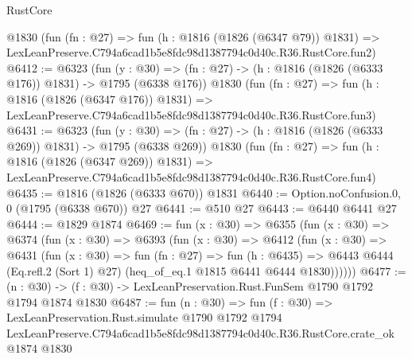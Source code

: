 \begin{lexlean}{RustCore}
\begin{coremodule}
    @1830
    (fun (fn : @27) =>
    fun (h : @1816 (@1826 (@6347 @79)) @1831) =>
    LexLeanPreserve.C794a6cad1b5e8fdc98d1387794c0d40c.R36.RustCore.fun2)
@6412 := @6323
    (fun (y : @30) => (fn : @27) -> (h : @1816 (@1826 (@6333 @176)) @1831) -> @1795 (@6338 @176))
    @1830
    (fun (fn : @27) =>
    fun (h : @1816 (@1826 (@6347 @176)) @1831) =>
    LexLeanPreserve.C794a6cad1b5e8fdc98d1387794c0d40c.R36.RustCore.fun3)
@6431 := @6323
    (fun (y : @30) => (fn : @27) -> (h : @1816 (@1826 (@6333 @269)) @1831) -> @1795 (@6338 @269))
    @1830
    (fun (fn : @27) =>
    fun (h : @1816 (@1826 (@6347 @269)) @1831) =>
    LexLeanPreserve.C794a6cad1b5e8fdc98d1387794c0d40c.R36.RustCore.fun4)
@6435 := @1816 (@1826 (@6333 @670)) @1831
@6440 := Option.noConfusion.{0, 0} (@1795 (@6338 @670)) @27
@6441 := @510 @27
@6443 := @6440 @6441 @27
@6444 := @1829 @1874
@6469 := fun (x : @30) =>
  @6355
    (fun (x : @30) =>
    @6374
      (fun (x : @30) =>
      @6393
        (fun (x : @30) =>
        @6412
          (fun (x : @30) =>
          @6431
            (fun (x : @30) =>
            fun (fn : @27) =>
            fun (h : @6435) =>
            @6443 @6444 (Eq.refl.{2} (Sort 1) @27) (heq_of_eq.{1} @1815 @6441 @6444 @1830))))))
@6477 := (n : @30) -> (f : @30) -> LexLeanPreservation.Rust.FunSem @1790 @1792 @1794 @1874 @1830
@6487 := fun (n : @30) =>
  fun (f : @30) =>
  LexLeanPreservation.Rust.simulate
    @1790
    @1792
    @1794
    LexLeanPreserve.C794a6cad1b5e8fdc98d1387794c0d40c.R36.RustCore.crate_ok
    @1874
    @1830
\end{coremodule}
\end{lexlean}
